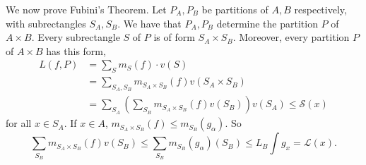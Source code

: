 We now prove Fubini's Theorem. Let $P_A, P_B$ be partitions of $A, B$ respectively, with subrectangles $S_A, S_B$. We have that $P_A, P_B$ determine the partition $P$ of $A \times B$. Every subrectangle $S$ of $P$ is of form $S_A \times S_B$. Moreover, every partition $P$ of $A \times B$ has this form,
\begin{align*}
    L(f, P) &= \sum_S m_S(f) \cdot v(S) \\
    &= \sum_{S_A, S_B} m_{S_A \times S_B} (f) v(S_A \times S_B) \\
    &= \sum_{S_A} \left( \sum_{S_B} m_{S_A \times S_B} (f) v(S_B) \right) v(S_A) \leq \mathcal{S}(x)
\end{align*}
for all $x \in S_A$. If $x \in A$, $m_{S_A \times S_B}(f) \leq m_{S_B}(g_\alpha)$. So
\[ \sum_{S_B} m_{S_A \times S_B} (f) v(S_B) \leq \sum_{S_B} m_{S_B}(g_\alpha) (S_B) \leq L_B \int g_x = \mathcal{L}(x). \]

